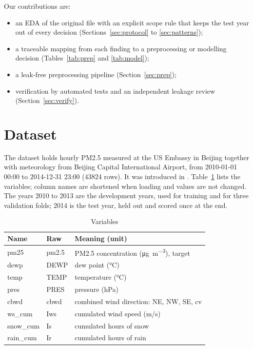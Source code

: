 \documentclass[conference]{IEEEtran}
\newcommand{\ugm}{\si{\micro\gram\per\cubic\metre}}
\begin{document}
Our contributions are:
\begin{itemize}
\item an EDA of the original file with an explicit scope rule that keeps the test year out of every decision (Sections~\ref{sec:protocol} to \ref{sec:patterns});
\item a traceable mapping from each finding to a preprocessing or modelling decision (Tables~\ref{tab:prep} and \ref{tab:model});
\item a leak-free preprocessing pipeline (Section~\ref{sec:prep});
\item verification by automated tests and an independent leakage review (Section~\ref{sec:verify}).
\end{itemize}

\section{Dataset}
The dataset \cite{uci} holds hourly PM2.5 measured at the US Embassy in Beijing together with meteorology from Beijing Capital International Airport, from 2010-01-01 00:00 to 2014-12-31 23:00 (\num{43824} rows). It was introduced in \cite{liang2015}. Table~\ref{tab:cols} lists the variables; column names are shortened when loading and values are not changed. The years 2010 to 2013 are the development years, used for training and for three validation folds; 2014 is the test year, held out and scored once at the end.

\begin{table}[!htb]
\centering
\caption{Variables}
\label{tab:cols}
\begin{tabular}{@{}lll@{}}
\toprule
Name & Raw & Meaning (unit) \\
\midrule
pm25 & pm2.5 & PM2.5 concentration (\ugm), target \\
dewp & DEWP & dew point (\si{\celsius}) \\
temp & TEMP & temperature (\si{\celsius}) \\
pres & PRES & pressure (hPa) \\
cbwd & cbwd & combined wind direction: NE, NW, SE, cv \\
ws\_cum & Iws & cumulated wind speed (m/s) \\
snow\_cum & Is & cumulated hours of snow \\
rain\_cum & Ir & cumulated hours of rain \\
\bottomrule
\end{tabular}
\end{table}
\end{document}
